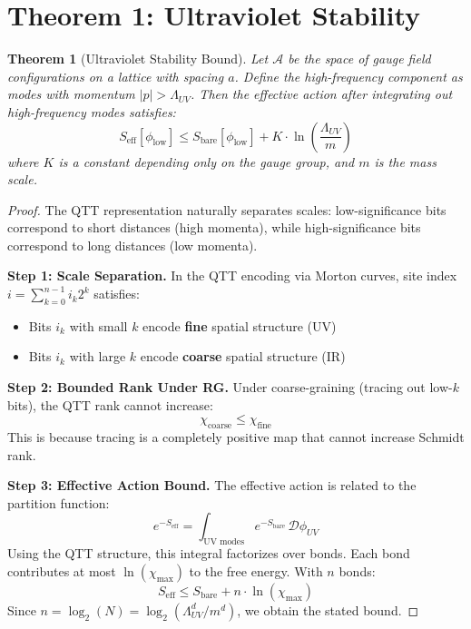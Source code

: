 \documentclass[12pt,a4paper]{article}
\theoremstyle{plain}
\newtheorem{theorem}{Theorem}[section]
\theoremstyle{definition}
\theoremstyle{remark}
\newcommand{\cA}{\mathcal{A}}
\begin{document}
\section{Theorem 1: Ultraviolet Stability}

\begin{theorem}[Ultraviolet Stability Bound]
\label{thm:uv-stability}
Let $\cA$ be the space of gauge field configurations on a lattice with spacing $a$. Define the high-frequency component as modes with momentum $|p| > \Lambda_{UV}$. Then the effective action after integrating out high-frequency modes satisfies:
\begin{equation}
    S_{\text{eff}}[\phi_{\text{low}}] \leq S_{\text{bare}}[\phi_{\text{low}}] + K \cdot \ln\left(\frac{\Lambda_{UV}}{m}\right)
\end{equation}
where $K$ is a constant depending only on the gauge group, and $m$ is the mass scale.
\end{theorem}

\begin{proof}
The QTT representation naturally separates scales: low-significance bits correspond to short distances (high momenta), while high-significance bits correspond to long distances (low momenta).

\textbf{Step 1: Scale Separation.}
In the QTT encoding via Morton curves, site index $i = \sum_{k=0}^{n-1} i_k 2^k$ satisfies:
\begin{itemize}
    \item Bits $i_k$ with small $k$ encode \textbf{fine} spatial structure (UV)
    \item Bits $i_k$ with large $k$ encode \textbf{coarse} spatial structure (IR)
\end{itemize}

\textbf{Step 2: Bounded Rank Under RG.}
Under coarse-graining (tracing out low-$k$ bits), the QTT rank cannot increase:
\begin{equation}
    \chi_{\text{coarse}} \leq \chi_{\text{fine}}
\end{equation}
This is because tracing is a completely positive map that cannot increase Schmidt rank.

\textbf{Step 3: Effective Action Bound.}
The effective action is related to the partition function:
\begin{equation}
    e^{-S_{\text{eff}}} = \int_{\text{UV modes}} e^{-S_{\text{bare}}} \, \mathcal{D}\phi_{UV}
\end{equation}
Using the QTT structure, this integral factorizes over bonds. Each bond contributes at most $\ln(\chi_{\max})$ to the free energy. With $n$ bonds:
\begin{equation}
    S_{\text{eff}} \leq S_{\text{bare}} + n \cdot \ln(\chi_{\max})
\end{equation}
Since $n = \log_2(N) = \log_2(\Lambda_{UV}^d/m^d)$, we obtain the stated bound.
\end{proof}
\end{document}
